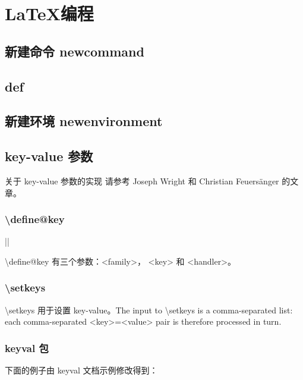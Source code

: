 \chapter{{\LaTeX 编程}}

\section{新建命令 {\ttfamily newcommand}}

\section{{\ttfamily def}}

\section{新建环境 {\ttfamily newenvironment}}

\section{key-value 参数}

关于 key-value 参数的实现 请参考 Joseph Wright 和 Christian Feuersänger 的文章\cite{TUGBOAT2009}。

\subsection{{\ttfamily \textbackslash define@key}}

||

{\ttfamily \textbackslash define@key} 有三个参数：{\ttfamily <family>}，
{\ttfamily <key>} 和 {\ttfamily <handler>}。

\subsection{{\ttfamily \textbackslash setkeys}}

{\ttfamily \textbackslash setkeys} 用于设置 key-value。The input to {\ttfamily \textbackslash setkeys} is a comma-separated list: each comma-separated {\ttfamily <key>=<value>} pair is therefore processed in turn. 

\subsection{ keyval 包}

下面的例子由 keyval 文档示例修改得到：

